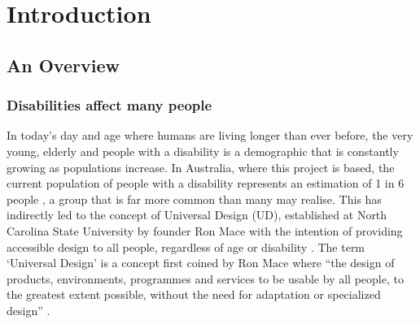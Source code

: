 
\chapter{Introduction}\label{chapter:firstchapter} %

\label{Chapter1} %


\section{An Overview}\label{sec:firstsection} %

\subsection{Disabilities affect many people}
In today's day and age where humans are living longer than ever before, the very young, elderly and people with a disability is a demographic that is constantly growing as populations increase.
In Australia, where this project is based, the current population of people with a disability represents an estimation of 1 in 6 people \cite{ausstats}, a group that is far more common than many may realise.
This has indirectly led to the concept of Universal Design (UD), established at North Carolina State University by founder Ron Mace with the intention of providing accessible design to all people, regardless of age or disability \cite{ronald}.
The term ‘Universal Design’ is a concept first coined by Ron Mace where “the design of products, environments, programmes and services to be usable by all people, to the greatest extent possible, without the need for adaptation or specialized design” \cite{nda}. 

